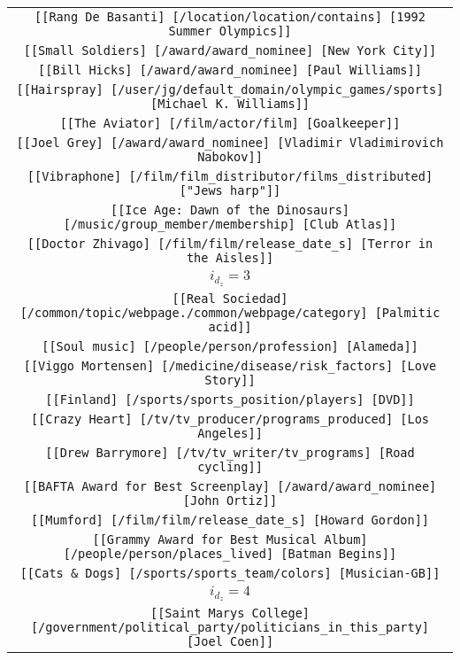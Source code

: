 \begin{longtable}{|c|}
    \texttt{[[Rang De Basanti] [/location/location/contains] [1992 Summer Olympics]]}\\
    \texttt{[[Small Soldiers] [/award/award\_nominee] [New York City]]}\\
    \texttt{[[Bill Hicks] [/award/award\_nominee] [Paul Williams]]}\\
    \texttt{[[Hairspray] [/user/jg/default\_domain/olympic\_games/sports] [Michael K. Williams]]}\\
    \texttt{[[The Aviator] [/film/actor/film] [Goalkeeper]]}\\
    \texttt{[[Joel Grey] [/award/award\_nominee] [Vladimir Vladimirovich Nabokov]]}\\
    \texttt{[[Vibraphone] [/film/film\_distributor/films\_distributed] ["Jews harp"]]}\\
    \texttt{[[Ice Age: Dawn of the Dinosaurs] [/music/group\_member/membership] [Club Atlas]]}\\
    \texttt{[[Doctor Zhivago] [/film/film/release\_date\_s] [Terror in the Aisles]]}\\
    \hline
    \rowcolor[HTML]{EFEFEF} 
    \textsc{$i_{d_z}=3$}\\ \hline
    \texttt{[[Real Sociedad] [/common/topic/webpage./common/webpage/category] [Palmitic acid]]}\\
    \texttt{[[Soul music] [/people/person/profession] [Alameda]]}\\
    \texttt{[[Viggo Mortensen] [/medicine/disease/risk\_factors] [Love Story]]}\\
    \texttt{[[Finland] [/sports/sports\_position/players] [DVD]]}\\
    \texttt{[[Crazy Heart] [/tv/tv\_producer/programs\_produced] [Los Angeles]]}\\
    \texttt{[[Drew Barrymore] [/tv/tv\_writer/tv\_programs] [Road cycling]]}\\
    \texttt{[[BAFTA Award for Best Screenplay] [/award/award\_nominee] [John Ortiz]]}\\
    \texttt{[[Mumford] [/film/film/release\_date\_s] [Howard Gordon]]}\\
    \texttt{[[Grammy Award for Best Musical Album] [/people/person/places\_lived] [Batman Begins]]}\\
    \texttt{[[Cats \& Dogs] [/sports/sports\_team/colors] [Musician-GB]]}\\
    \hline
    \rowcolor[HTML]{EFEFEF} 
    \textsc{$i_{d_z}=4$}\\ \hline
    \texttt{[[Saint Marys College] [/government/political\_party/politicians\_in\_this\_party] [Joel Coen]]}\\

\end{longtable}
